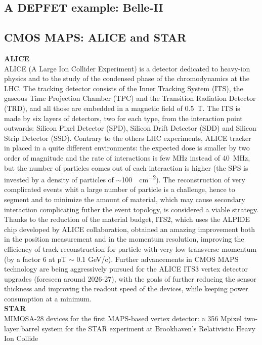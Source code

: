     \subsection{A DEPFET example: Belle-II}
        

    \subsection{CMOS MAPS: ALICE and STAR}
        \textbf{ALICE}\\
        ALICE (A Large Ion Collider Experiment) is a detector dedicated to heavy-ion physics and to the study of the condensed phase of the chromodynamics at the LHC.
        The tracking detector consists of the Inner Tracking System (ITS), the gaseous Time Projection Chamber (TPC) and the Transition Radiation Detector (TRD),  and all those are embedded in a magnetic field of \SI{0.5}{T}. The ITS is made by six layers of detectors, two for each type, from the interaction point outwards: Silicon Pixel Detector (SPD), Silicon Drift Detector (SDD) and Silicon Strip Detector (SSD).         
        Contrary to the others LHC experiments, ALICE tracker in placed in a quite different environments: the expected dose is smaller by two order of magnitude and the rate of interactions is few \si{MHz} instead of \SI{40}{MHz}, but the number of particles comes out of each interaction is higher (the SPS is invested by a density of particles of $\sim$\SI{100}{\per cm\tothe{-2}}).  
        The reconstruction of very complicated events whit a large number of particle is a challenge, hence to segment and to minimize the amount of material, which may cause secondary interaction complicating futher the event topology, is considered a viable strategy. 
        Thanks to the reduction of the material budget, ITS2, which uses the ALPIDE chip developed by ALICE collaboration, obtained an amazing improvement both in the position measurement and in the momentum resolution, improving the efficiency of track reconstruction for particle with very low transverse momentum (by a factor 6 at pT $\sim$ 0.1 GeV/c). Further advancements in CMOS MAPS technology are being aggressively pursued for the ALICE ITS3 vertex detector upgrades (foreseen around 2026-27), with the goals of further reducing the sensor thickness and improving the readout speed of the devices, while keeping power consumption at a minimum.\\
        \vspace{5mm}
        \textbf{STAR}\\
        MIMOSA-28 devices for the first MAPS-based vertex detector: a 356 Mpixel two-layer barrel system for the STAR experiment at Brookhaven’s Relativistic Heavy Ion Collide

